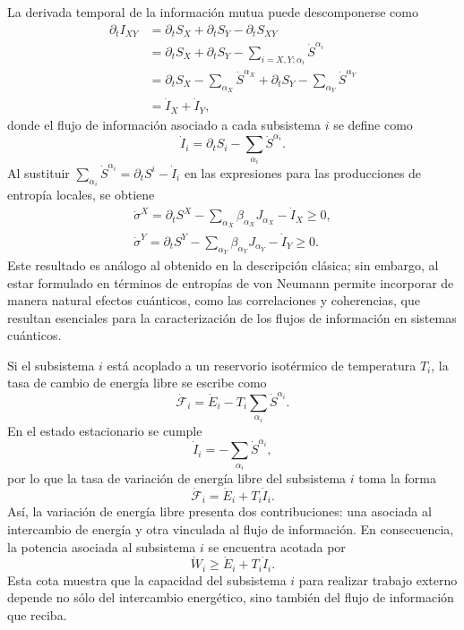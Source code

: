 La derivada temporal de la información mutua puede descomponerse como
\begin{align*}
    \partial_{t}I_{XY} & = \partial_{t}S_{X} + \partial_{t}S_{Y} - \partial_{t}S_{XY} \\
        & = \partial_{t}S_{X} + \partial_{t}S_{Y} - \sum_{i=X,Y;\alpha_{i}}\dot{S}^{\alpha_{i}} \\
        & = \partial_{t}S_{X} - \sum_{\alpha_{X}} \dot{S}^{\alpha_{X}} + \partial_{t}S_{Y} - \sum_{\alpha_{Y}} \dot{S}^{\alpha_{Y}} \\
        & = \dot{I}_{X} + \dot{I}_{Y},
\end{align*}
donde el flujo de información asociado a cada subsistema $i$ se define como
\[
    \dot{I}_{i} = \partial_{t} S_{i} - \sum_{\alpha_{i}} \dot{S}^{\alpha_{i}}.
\]
Al sustituir $\sum_{\alpha_{i}} \dot{S}^{\alpha_{i}} = \partial_{t} S^{i} - \dot{I}_{i}$ en las expresiones para las producciones de entropía locales, se obtiene
\begin{align}
    \dot{\sigma}^{X} = \partial_{t}S^{X} - \sum_{\alpha_{X}} \beta_{\alpha_{X}} J_{\alpha_{X}} - \dot{I}_{X} \geq 0, \\
    \dot{\sigma}^{Y} = \partial_{t}S^{Y} - \sum_{\alpha_{Y}} \beta_{\alpha_{Y}} J_{\alpha_{Y}} - \dot{I}_{Y} \geq 0.
    \label{sec4:localentropyquantum}
\end{align}
Este resultado es análogo al obtenido en la descripción clásica; sin embargo, al estar formulado en términos de entropías de von Neumann permite incorporar de manera natural efectos cuánticos, como las correlaciones y coherencias, que resultan esenciales para la caracterización de los flujos de información en sistemas cuánticos.

Si el subsistema $i$ está acoplado a un reservorio isotérmico de temperatura $T_i$, la tasa de cambio de energía libre se escribe como
\[
    \dot{\mathcal{F}}_{i} = \dot{E}_{i} - T_{i} \sum_{\alpha_{i}}\dot{S}^{\alpha_{i}}.
\]
En el estado estacionario se cumple
\[
    \dot{I}_{i} = - \sum_{\alpha_{i}}\dot{S}^{\alpha_{i}},
\]
por lo que la tasa de variación de energía libre del subsistema $i$ toma la forma
\[
    \dot{\mathcal{F}}_{i} = \dot{E}_{i} + T_{i} \dot{I}_{i}.
\]
Así, la variación de energía libre presenta dos contribuciones: una asociada al intercambio de energía y otra vinculada al flujo de información. En consecuencia, la potencia asociada al subsistema $i$ se encuentra acotada por
\[
    \dot{W}_{i} \geq \dot{E}_{i} + T_{i}\dot{I}_{i}.
\]
Esta cota muestra que la capacidad del subsistema $i$ para realizar trabajo externo depende no sólo del intercambio energético, sino también del flujo de información que reciba.

